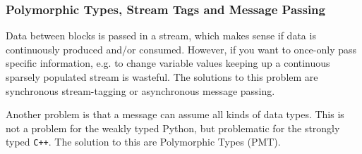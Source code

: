 \documentclass{article}
\begin{document}
\subsubsection{Polymorphic Types, Stream Tags and Message Passing}

Data between blocks is passed in a stream, which makes sense if data is continuously produced and/or consumed. However, if you want to once-only pass specific information, e.g. to change variable values keeping up a continuous sparsely populated stream is wasteful. The solutions to this problem are synchronous stream-tagging or asynchronous message passing.

\bigskip

Another problem is that a message can assume all kinds of data types. This is not a problem for the weakly typed Python, but problematic for the strongly typed \texttt{C++}. The solution to this are Polymorphic Types (PMT).
\end{document}
